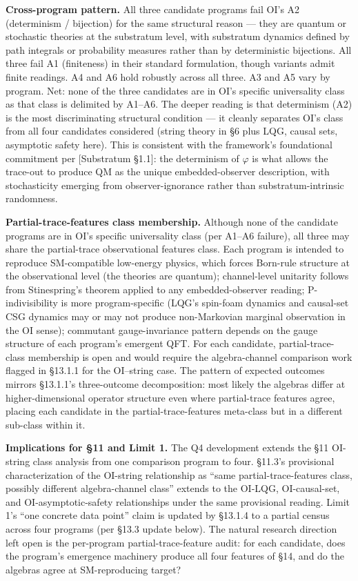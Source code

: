 \documentclass[
]{article}
\begin{document}
\textbf{Cross-program pattern.} All three candidate programs fail OI's
A2 (determinism / bijection) for the same structural reason --- they are
quantum or stochastic theories at the substratum level, with substratum
dynamics defined by path integrals or probability measures rather than
by deterministic bijections. All three fail A1 (finiteness) in their
standard formulation, though variants admit finite readings. A4 and A6
hold robustly across all three. A3 and A5 vary by program. Net: none of
the three candidates are in OI's specific universality class as that
class is delimited by A1--A6. The deeper reading is that determinism
(A2) is the most discriminating structural condition --- it cleanly
separates OI's class from all four candidates considered (string theory
in §6 plus LQG, causal sets, asymptotic safety here). This is consistent
with the framework's foundational commitment per {[}Substratum §1.1{]}:
the determinism of \(\varphi\) is what allows the trace-out to produce
QM as the unique embedded-observer description, with stochasticity
emerging from observer-ignorance rather than substratum-intrinsic
randomness.

\textbf{Partial-trace-features class membership.} Although none of the
candidate programs are in OI's specific universality class (per A1--A6
failure), all three may share the partial-trace observational features
class. Each program is intended to reproduce SM-compatible low-energy
physics, which forces Born-rule structure at the observational level
(the theories are quantum); channel-level unitarity follows from
Stinespring's theorem applied to any embedded-observer reading;
P-indivisibility is more program-specific (LQG's spin-foam dynamics and
causal-set CSG dynamics may or may not produce non-Markovian marginal
observation in the OI sense); commutant gauge-invariance pattern depends
on the gauge structure of each program's emergent QFT. For each
candidate, partial-trace-class membership is open and would require the
algebra-channel comparison work flagged in §13.1.1 for the OI--string
case. The pattern of expected outcomes mirrors §13.1.1's three-outcome
decomposition: most likely the algebras differ at higher-dimensional
operator structure even where partial-trace features agree, placing each
candidate in the partial-trace-features meta-class but in a different
sub-class within it.

\textbf{Implications for §11 and Limit 1.} The Q4 development extends
the §11 OI-string class analysis from one comparison program to four.
§11.3's provisional characterization of the OI-string relationship as
``same partial-trace-features class, possibly different algebra-channel
class'' extends to the OI-LQG, OI-causal-set, and OI-asymptotic-safety
relationships under the same provisional reading. Limit 1's ``one
concrete data point'' claim is updated by §13.1.4 to a partial census
across four programs (per §13.3 update below). The natural research
direction left open is the per-program partial-trace-feature audit: for
each candidate, does the program's emergence machinery produce all four
features of §14, and do the algebras agree at SM-reproducing target?
\end{document}
